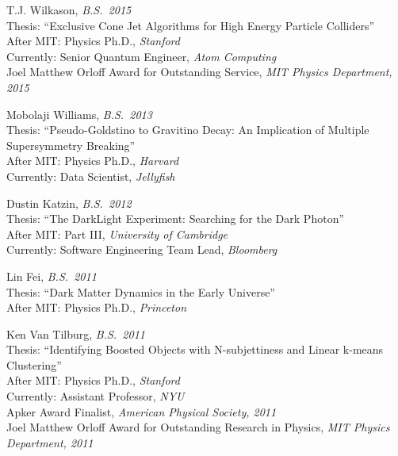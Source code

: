 \item T.J. Wilkason, \emph{B.S.~2015}
\\ Thesis: ``Exclusive Cone Jet Algorithms for High Energy Particle Colliders''
\\ After MIT: Physics Ph.D., \emph{Stanford}
\\ Currently: Senior Quantum Engineer, \emph{Atom Computing}
\\ Joel Matthew Orloff Award for Outstanding Service, \emph{MIT Physics Department, 2015}

\item Mobolaji Williams, \emph{B.S.~2013}
\\ Thesis: ``Pseudo-Goldstino to Gravitino Decay: An Implication of Multiple Supersymmetry Breaking''
\\ After MIT: Physics Ph.D., \emph{Harvard}
\\ Currently: Data Scientist, \emph{Jellyfish}

\item Dustin Katzin, \emph{B.S.~2012}
\\ Thesis: ``The DarkLight Experiment: Searching for the Dark Photon''
\\ After MIT: Part III, \emph{University of Cambridge}
\\ Currently: Software Engineering Team Lead, \emph{Bloomberg}

\item Lin Fei, \emph{B.S.~2011}
\\ Thesis: ``Dark Matter Dynamics in the Early Universe''
\\ After MIT: Physics Ph.D., \emph{Princeton}

\item Ken Van Tilburg, \emph{B.S.~2011}
\\ Thesis: ``Identifying Boosted Objects with N-subjettiness and Linear k-means Clustering''
\\ After MIT: Physics Ph.D., \emph{Stanford}
\\ Currently: Assistant Professor, \emph{NYU}
\\ Apker Award Finalist, \emph{American Physical Society, 2011}
\\ Joel Matthew Orloff Award for Outstanding Research in Physics, \emph{MIT Physics Department, 2011}

\el
